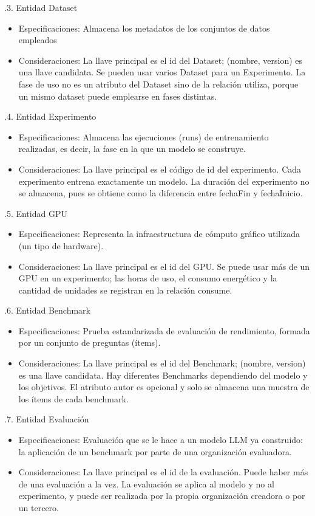\documentclass[12pt,a4paper]{article}
\begin{document}
.3. Entidad Dataset
{\begin{itemize}
  \item Especificaciones: Almacena los metadatos de los conjuntos de datos empleados
  \item Consideraciones: La llave principal es el id del Dataset; (nombre, version) es una llave candidata. Se pueden usar varios Dataset para un Experimento. La fase de uso no es un atributo del Dataset sino de la relación utiliza, porque un mismo dataset puede emplearse en fases distintas.
\end{itemize}
}

.4. Entidad Experimento
{\begin{itemize}
  \item Especificaciones: Almacena las ejecuciones (runs) de entrenamiento realizadas, es decir, la fase en la que un modelo se construye.
  \item Consideraciones: La llave principal es el código de id del experimento. Cada experimento entrena exactamente un modelo. La duración del experimento no se almacena, pues se obtiene como la diferencia entre fechaFin y fechaInicio.
\end{itemize}
}

.5. Entidad GPU
{\begin{itemize}
  \item Especificaciones: Representa la infraestructura de cómputo gráfico utilizada (un tipo de hardware).
  \item Consideraciones: La llave principal es el id del GPU. Se puede usar más de un GPU en un experimento; las horas de uso, el consumo energético y la cantidad de unidades se registran en la relación consume.
\end{itemize}
}

.6. Entidad Benchmark
{\begin{itemize}
  \item Especificaciones: Prueba estandarizada de evaluación de rendimiento, formada por un conjunto de preguntas (ítems).
  \item Consideraciones: La llave principal es el id del Benchmark; (nombre, version) es una llave candidata. Hay diferentes Benchmarks dependiendo del modelo y los objetivos. El atributo autor es opcional y solo se almacena una muestra de los ítems de cada benchmark.
\end{itemize}
}

.7. Entidad Evaluación
{\begin{itemize}
  \item Especificaciones: Evaluación que se le hace a un modelo LLM ya construido: la aplicación de un benchmark por parte de una organización evaluadora.
  \item Consideraciones: La llave principal es el id de la evaluación. Puede haber más de una evaluación a la vez. La evaluación se aplica al modelo y no al experimento, y puede ser realizada por la propia organización creadora o por un tercero.
\end{itemize}
}
\end{document}
